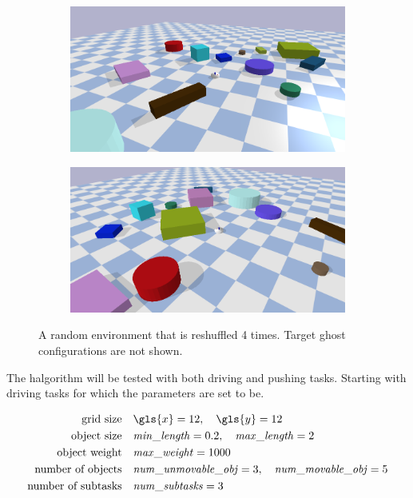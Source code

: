 \begin{figure}[H]
    \vspace{0.2cm}
    \begin{subfigure}{.49\textwidth}
    \includegraphics[width=\textwidth]{figures/results/random3}
    \end{subfigure}
    \hfill
    \begin{subfigure}{.49\textwidth}
    \centering
    \includegraphics[width=\textwidth]{figures/results/random4}
    \end{subfigure}
    \caption{A random environment that is reshuffled 4 times. Target ghost configurations are not shown.}
    \label{fig:random_environment_reshuffle}
\end{figure}

The \ac{halgorithm} will be tested with both driving and pushing tasks. Starting with driving tasks for which the parameters are set to be.\bs

\begin{center}
\begin{align*}
\text{grid size} \quad &\gls{x}=12, \quad \gls{y}=12 \\
\text{object size} \quad &\mathit{min\_length}=0.2, \quad \mathit{max\_length}=2 \\
\text{object weight} \quad &\mathit{max\_weight}=1000 \\
\text{number of objects} \quad &\mathit{num\_unmovable\_obj}=3, \quad \mathit{num\_movable\_obj}=5 \\
\text{number of subtasks} \quad &\mathit{num\_subtasks}=3
\end{align*}
\end{center}

